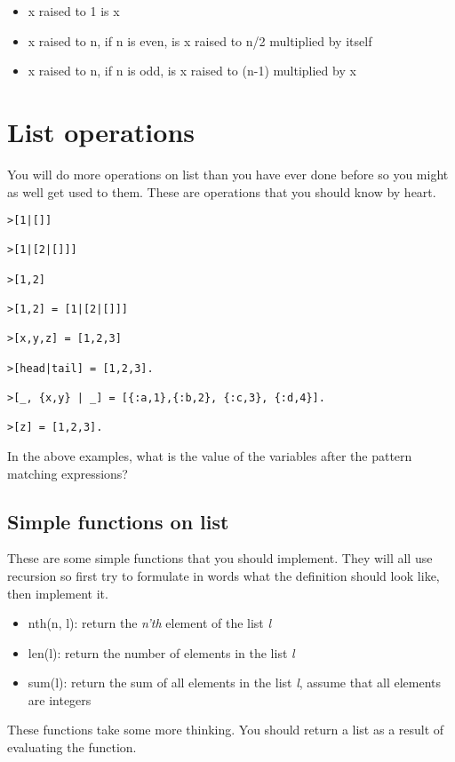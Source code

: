 \documentclass[a4paper,11pt]{article}
\begin{document}
\begin{itemize}
  \item x raised to 1 is x
  \item x raised to n, if n is even, is x raised to n/2 multiplied by itself
  \item x raised to n, if n is odd, is x raised to (n-1) multiplied by x
\end{itemize}


\section{List operations}

You will do more operations on list than you have ever done before so
you might as well get used to them. These are operations that you should
know by heart.

\begin{verbatim}
>[1|[]]

>[1|[2|[]]]

>[1,2]

>[1,2] = [1|[2|[]]]

>[x,y,z] = [1,2,3]

>[head|tail] = [1,2,3].

>[_, {x,y} | _] = [{:a,1},{:b,2}, {:c,3}, {:d,4}].

>[z] = [1,2,3].
\end{verbatim}

In the above examples, what is the value of the variables after the
pattern matching expressions?

\subsection{Simple functions on list}

These are some simple functions that you should implement. They will
all use recursion so first try to formulate in words what the
definition should look like, then implement it.

\begin{itemize}
\item nth(n, l): return the {\em n'th} element of the list {\em l}
\item len(l): return the number of elements in the list  {\em l}
\item sum(l): return the sum of all elements in the list  {\em l}, assume
  that all elements are integers
\end{itemize}


These functions take some more thinking. You should return a list as a
result of evaluating the function.
\end{document}
